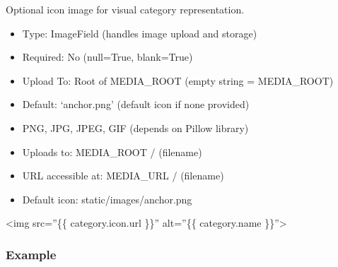 \documentclass[letterpaper,10pt,english]{sphinxmanual}
\begin{document}
\begin{fulllineitems}

\begin{fulllineitems}
\label{\detokenize{expensesApp:id12}}
\pysigstartsignatures
\pysigline
{}
\pysigstopsignatures
\sphinxAtStartPar
Optional icon image for visual category representation.
\begin{description}
\begin{itemize}
\item {} 
\sphinxAtStartPar
Type: ImageField (handles image upload and storage)

\item {} 
\sphinxAtStartPar
Required: No (null=True, blank=True)

\item {} 
\sphinxAtStartPar
Upload To: Root of MEDIA\_ROOT (empty string = MEDIA\_ROOT)

\item {} 
\sphinxAtStartPar
Default: ‘anchor.png’ (default icon if none provided)

\end{itemize}

\begin{itemize}
\item {} 
\sphinxAtStartPar
PNG, JPG, JPEG, GIF (depends on Pillow library)

\end{itemize}

\begin{itemize}
\item {} 
\sphinxAtStartPar
Uploads to: MEDIA\_ROOT / (filename)

\item {} 
\sphinxAtStartPar
URL accessible at: MEDIA\_URL / (filename)

\item {} 
\sphinxAtStartPar
Default icon: static/images/anchor.png

\end{itemize}

\sphinxAtStartPar
\textless{}img src=”\{\{ category.icon.url \}\}” alt=”\{\{ category.name \}\}”\textgreater{}

\end{description}
\subsubsection*{Example}


\end{fulllineitems}
\end{fulllineitems}
\end{document}
